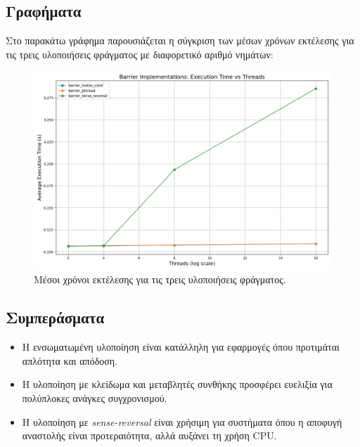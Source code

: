 \documentclass{article}
\begin{document}
\subsection*{Γραφήματα} Στο παρακάτω γράφημα παρουσιάζεται η σύγκριση των μέσων χρόνων εκτέλεσης για τις τρεις υλοποιήσεις φράγματος με διαφορετικό αριθμό νημάτων:
\begin{figure}[h] 
    \centering 
    \includegraphics[width=1\textwidth]{barrier_results.png} 
    \caption{Μέσοι χρόνοι εκτέλεσης για τις τρεις υλοποιήσεις φράγματος.} 
\end{figure}
\subsection*{Συμπεράσματα} 
\begin{itemize} 
    \item Η ενσωματωμένη υλοποίηση  είναι κατάλληλη για εφαρμογές όπου προτιμάται απλότητα και απόδοση. 
    \item Η υλοποίηση με κλείδωμα και μεταβλητές συνθήκης προσφέρει ευελιξία για πολύπλοκες ανάγκες συγχρονισμού. 
    \item Η υλοποίηση με \textit{sense-reversal} είναι χρήσιμη για συστήματα όπου η αποφυγή αναστολής είναι προτεραιότητα, αλλά αυξάνει τη χρήση CPU. 
\end{itemize}
\end{document}
